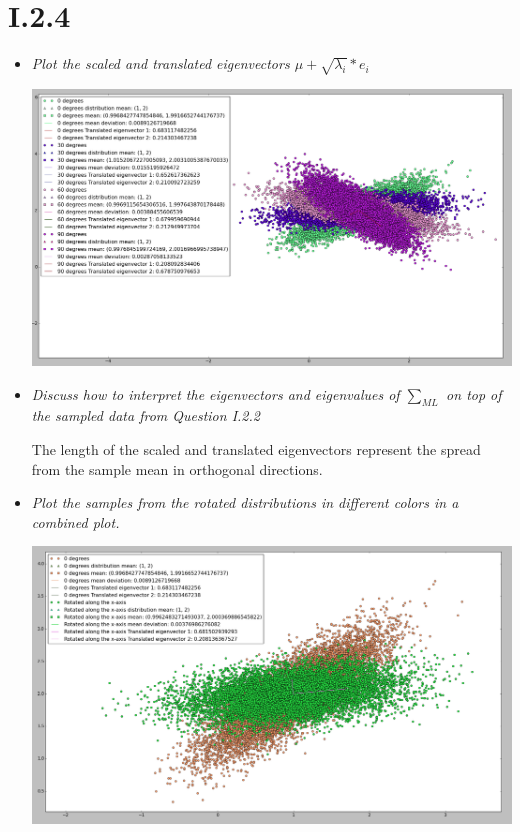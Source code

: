 \documentclass[12pt, a4paper]{article}
\begin{document}
\section{I.2.4}
\begin{itemize}
\item \textit{Plot the scaled and translated eigenvectors $\mu + \sqrt{\lambda_i} * e_i$}

\includegraphics[width=\textwidth]{6.png}

\item \textit{Discuss how to interpret the eigenvectors and eigenvalues of $\sum _{ML} $ on top of the sampled data from Question I.2.2}

The length of the scaled and translated eigenvectors represent the spread from the sample mean in orthogonal directions. 

\item \textit{Plot the samples from the rotated distributions in different colors in a combined plot.}

\includegraphics[width=\textwidth]{7.png}


\end{itemize}
\end{document}
